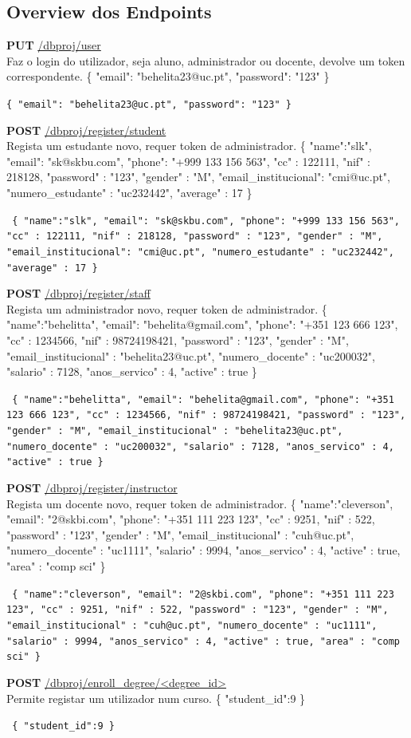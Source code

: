 \documentclass[a4paper, 11pt]{article}
\begin{document}
\newcommand\PUT{{\bfseries\color{Blue} PUT}}
\newcommand\POST{{\bfseries\color{BurntOrange} POST}}
\newcommand\GET{{\bfseries\color{Green} GET}}
\newcommand\DELETE{{\bfseries\color{Maroon} DELETE}}

\newcommand\requestpar[4]{
  \vspace{0.5em}
  \noindent
  {#1} \href{http://localhost:8080#2}{#2}\\{#3}
  \vspace{0.5em}
  \ifx\relax#4\relax\else
    \par\hfill\begin{minipage}{0.95\textwidth}
    {\texttt{#4}}
    \end{minipage} 
  \fi
  \par
  \vspace{1em}
}

\subsection{Overview dos Endpoints}
\requestpar{\PUT}{/dbproj/user}{Faz o login do utilizador, seja aluno, administrador ou docente, devolve um token correspondente.}{\{   "email": "behelita23@uc.pt", "password": "123" \}}
\requestpar{\POST}{/dbproj/register/student}{Regista um estudante novo, requer token de administrador.}{
\{
    "name":"slk",
    "email": "sk@skbu.com",
    "phone": "+999 133 156 563",
    "cc" : 122111,
    "nif" : 218128,
    "password" : "123", 
    "gender" : "M",
    "email\_institucional": "cmi@uc.pt", 
    "numero\_estudante" : "uc232442", 
    "average" : 17
\}
}
\requestpar{\POST}{/dbproj/register/staff}{Regista um administrador novo, requer token de administrador.}{
\{
  "name":"behelitta",
  "email": "behelita@gmail.com",
  "phone": "+351 123 666 123",
  "cc" : 1234566,
  "nif" : 98724198421,
  "password" : "123",
  "gender" : "M",
  "email\_institucional" : "behelita23@uc.pt",
  "numero\_docente" : "uc200032",
  "salario" : 7128,
  "anos\_servico" : 4,
  "active" : true
\}}
\requestpar{\POST}{/dbproj/register/instructor}{Regista um docente novo, requer token de administrador.}{
\{
    "name":"cleverson",
    "email": "2@skbi.com",
    "phone": "+351 111 223 123",
    "cc" : 9251,
    "nif" : 522,
    "password" : "123", 
    "gender" : "M",
    "email\_institucional" : "cuh@uc.pt",
    "numero\_docente" : "uc1111",
    "salario" : 9994, 
    "anos\_servico" : 4, 
    "active" : true,
    "area" : "comp sci"
\}
}
\requestpar{\POST}{/dbproj/enroll\_degree/<degree\_id>}{Permite registar um utilizador num curso.}{
\{ "student\_id":9 \}}
\end{document}
